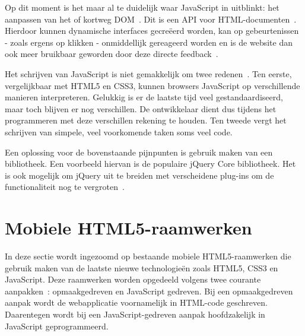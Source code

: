 Op dit moment is het maar al te duidelijk waar JavaScript in uitblinkt: het aanpassen van het  of kortweg DOM~\cite{PhilDutson2012}. 
Dit is een API voor HTML-documenten~\cite{Hegaret2004}. 
Hierdoor kunnen dynamische interfaces gecreëerd worden, kan op gebeurtenissen - zoals ergens op klikken - onmiddellijk gereageerd worden en is de website dan ook meer bruikbaar geworden door deze directe feedback~\cite{McFarland2011}.

Het schrijven van JavaScript is niet gemakkelijk om twee redenen~\cite{McFarland2011}. 
Ten eerste, vergelijkbaar met HTML5 en CSS3, kunnen browsers JavaScript op verschillende manieren interpreteren. 
Gelukkig is er de laatste tijd veel gestandaardiseerd, maar toch blijven er nog verschillen. %
De ontwikkelaar dient dus tijdens het programmeren met deze verschillen rekening te houden. 
Ten tweede vergt het schrijven van simpele, veel voorkomende taken soms veel code.

Een oplossing voor de bovenstaande pijnpunten is gebruik maken van een bibliotheek. 
Een voorbeeld hiervan is de populaire jQuery Core bibliotheek. 
Het is ook mogelijk om jQuery uit te breiden met verscheidene plug-ins om de functionaliteit nog te vergroten~\cite{McFarland2011}.



\section{Mobiele HTML5-raamwerken}
\label{sec:mobiele-html5-raamwerken}

In deze sectie wordt ingezoomd op bestaande mobiele HTML5-raamwerken die gebruik maken van de laatste nieuwe technologieën zoals HTML5, CSS3 en JavaScript.
Deze raamwerken worden opgedeeld volgens twee courante aanpakken~\cite{Oeflman2011}: opmaakgedreven en JavaScript gedreven. Bij een opmaakgedreven aanpak wordt de webapplicatie voornamelijk in HTML-code geschreven. Daarentegen wordt bij een JavaScript-gedreven aanpak hoofdzakelijk in JavaScript geprogrammeerd.


